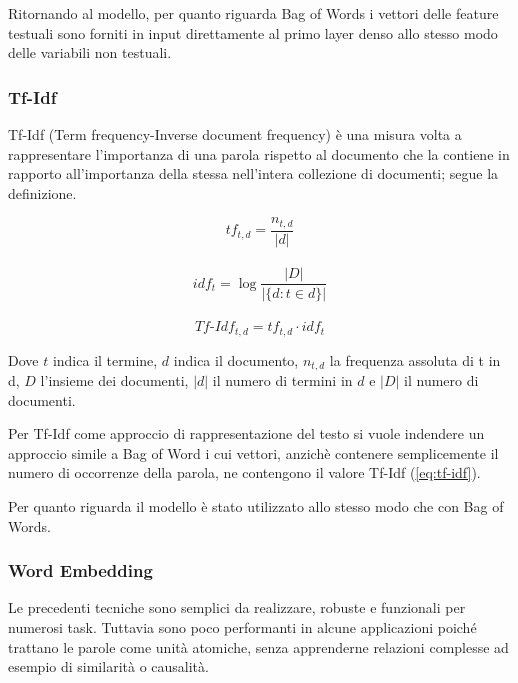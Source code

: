 Ritornando al modello, per quanto riguarda Bag of Words i vettori delle feature
testuali sono forniti in input direttamente al primo layer denso allo stesso
modo delle variabili non testuali.

\subsubsection{Tf-Idf}\label{section-tfidf} Tf-Idf (Term frequency-Inverse
document frequency) \cite{manning_raghavan_schutze_2008} è una misura volta a
rappresentare l'importanza di una parola rispetto al documento che la contiene
in rapporto all'importanza della stessa nell'intera collezione di documenti;
segue la definizione.%

\begin{equation}
\label{eq:tf}
   tf_{t,d} = \frac{n_{t,d}}{|d|} 
\end{equation}
\\
\begin{equation}
\label{eq:idf}
   idf_{t} = \log \frac{|D|}{|\{d: t \in d\}|} 
\end{equation}
\\
\begin{equation}
\label{eq:tf-idf}
    Tf\mbox{-}Idf_{t,d} = tf_{t,d} \cdot idf_t
\end{equation}

Dove $t$ indica il termine, $d$
indica il documento, $n_{t,d}$ la frequenza assoluta di t in d, $D$ l'insieme
dei documenti, $|d|$ il numero di termini in $d$ e $|D|$ il numero di documenti.

Per Tf-Idf come approccio di rappresentazione del testo si vuole indendere un
approccio simile a Bag of Word i cui vettori, anzichè contenere semplicemente il
numero di occorrenze della parola, ne contengono il valore Tf-Idf
(\ref{eq:tf-idf}).

Per quanto riguarda il modello è stato utilizzato allo stesso modo che con Bag
of Words. 



\subsubsection{Word Embedding}

Le precedenti tecniche sono semplici da realizzare, robuste e funzionali per
numerosi task. Tuttavia sono poco performanti in alcune applicazioni poiché
trattano le parole come unità atomiche, senza apprenderne relazioni complesse
ad esempio di similarità o causalità.

